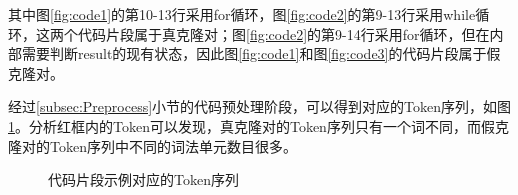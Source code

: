 其中图\ref{fig:code1}的第10-13行采用for循环，图\ref{fig:code2}的第9-13行采用while循环，这两个代码片段属于真克隆对；图\ref{fig:code2}的第9-14行采用for循环，但在内部需要判断result的现有状态，因此图\ref{fig:code1}和图\ref{fig:code3}的代码片段属于假克隆对。

经过\ref{subsec:Preprocess}小节的代码预处理阶段，可以得到对应的Token序列，如图\ref{fig:token}。分析红框内的Token可以发现，真克隆对的Token序列只有一个词不同，而假克隆对的Token序列中不同的词法单元数目很多。

\begin{figure}[htp] 
  \centering  %
  \caption{代码片段示例对应的Token序列}    %
  \label{fig:token}    %
\end{figure}
    
        
